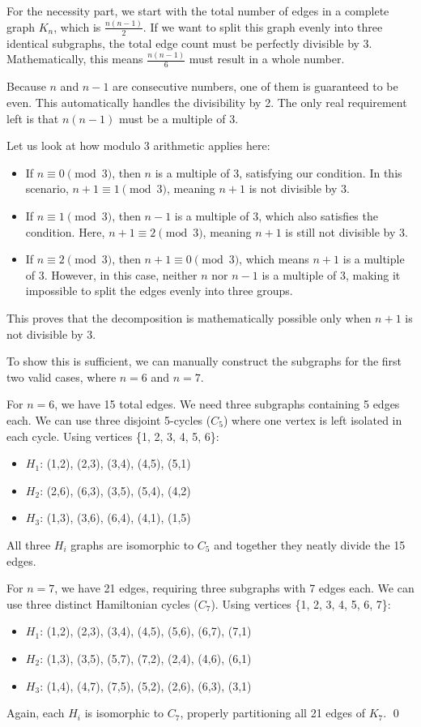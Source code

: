 \documentclass[a4paper]{exam}
\begin{document}
\begin{questions}
\begin{solution}
For the necessity part, we start with the total number of edges in a complete graph $K_n$, which is $\frac{n(n-1)}{2}$. If we want to split this graph evenly into three identical subgraphs, the total edge count must be perfectly divisible by 3. Mathematically, this means $\frac{n(n-1)}{6}$ must result in a whole number.

Because $n$ and $n-1$ are consecutive numbers, one of them is guaranteed to be even. This automatically handles the divisibility by 2. The only real requirement left is that $n(n-1)$ must be a multiple of 3.

Let us look at how modulo 3 arithmetic applies here:
\begin{itemize}
    \item If $n \equiv 0 \pmod 3$, then $n$ is a multiple of 3, satisfying our condition. In this scenario, $n+1 \equiv 1 \pmod 3$, meaning $n+1$ is not divisible by 3.
    \item If $n \equiv 1 \pmod 3$, then $n-1$ is a multiple of 3, which also satisfies the condition. Here, $n+1 \equiv 2 \pmod 3$, meaning $n+1$ is still not divisible by 3.
    \item If $n \equiv 2 \pmod 3$, then $n+1 \equiv 0 \pmod 3$, which means $n+1$ is a multiple of 3. However, in this case, neither $n$ nor $n-1$ is a multiple of 3, making it impossible to split the edges evenly into three groups.
\end{itemize}

This proves that the decomposition is mathematically possible only when $n+1$ is not divisible by 3.

To show this is sufficient, we can manually construct the subgraphs for the first two valid cases, where $n=6$ and $n=7$.

For $n=6$, we have 15 total edges. We need three subgraphs containing 5 edges each. We can use three disjoint 5-cycles ($C_5$) where one vertex is left isolated in each cycle. Using vertices \{1, 2, 3, 4, 5, 6\}:
\begin{itemize}
    \item $H_1$: (1,2), (2,3), (3,4), (4,5), (5,1)
    \item $H_2$: (2,6), (6,3), (3,5), (5,4), (4,2)
    \item $H_3$: (1,3), (3,6), (6,4), (4,1), (1,5)
\end{itemize}
All three $H_i$ graphs are isomorphic to $C_5$ and together they neatly divide the 15 edges.

For $n=7$, we have 21 edges, requiring three subgraphs with 7 edges each. We can use three distinct Hamiltonian cycles ($C_7$). Using vertices \{1, 2, 3, 4, 5, 6, 7\}:
\begin{itemize}
    \item $H_1$: (1,2), (2,3), (3,4), (4,5), (5,6), (6,7), (7,1)
    \item $H_2$: (1,3), (3,5), (5,7), (7,2), (2,4), (4,6), (6,1)
    \item $H_3$: (1,4), (4,7), (7,5), (5,2), (2,6), (6,3), (3,1)
\end{itemize}
Again, each $H_i$ is isomorphic to $C_7$, properly partitioning all 21 edges of $K_7$. \qed
\end{solution}

 

\end{questions}
\end{document}
